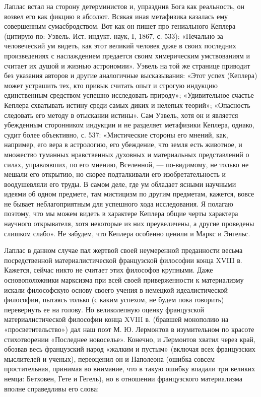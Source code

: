 Лаплас  встал   на  сторону   детерминистов  и,  упразднив   Бога  как
реальность, он возвел его как фикцию в абсолют. Всякая иная метафизика
казалась  ему  совершенным  сумасбродством.   Вот  как  он  пишет  про
гениального Кеплера (цитирую  по: Уэвель. Ист. индукт.  наук, I, 1867,
с. 533): «Печально за человеческий ум видеть, как этот великий человек
даже в  своих последних  произведениях с наслаждением  предается своим
химерическим  умствованиям и  считает их  душой и  жизнью астрономии».
Уэвель  на той  же странице  приводит  без указания  авторов и  другие
аналогичные высказывания:  «Этот успех (Кеплера) может  устрашить тех,
кто  привык считать  опыт  и строгую  индукцию единственным  средством
успешно исследовать природу»; «Удивительное счастье Кеплера схватывать
истину среди самых  диких и нелепых теорий»;  «Опасность следовать его
методу в отыскании истины». Сам  Уэвель, хотя он и является убежденным
сторонником индукции и не  разделяет метафизики Кеплера, однако, судит
более  объективно,  с.  537:  «Мистические стороны  его  мнений,  как,
например,  его  вера  в  астрологию, его  убеждение,  что  земля  есть
животное, и  множество туманных  нравственных духовных  и материальных
представлений  о силах,  управлявших,  по его  мнению, Вселенной,  ---
по-видимому, не только не мешали  его открытию, но скорее подталкивали
его изобретательность и  воодушевляли его труды. В самом  деле, где ум
обладает  ясными  научными идеями  об  одном  предмете, там  мистицизм
по  другим предметам,  кажется,  вовсе не  бывает неблагоприятным  для
успешного хода исследования. Я полагаю  поэтому, что мы можем видеть в
характере  Кеплера общие  черты характера  научного открывателя,  хотя
некоторые из них  преувеличены, а другие проведены  слишком слабо». Не
забудем, что Кеплера особенно ценили и Маркс и Энгельс.

Лаплас  в  данном случае  пал  жертвой  своей неумеренной  преданности
весьма посредственной  материалистической французской  философии конца
XVIII в.  Кажется, сейчас  никто не  считает этих  философов крупными.
Даже  основоположники  марксизма  при   всей  своей  приверженности  к
материализму  искали  философскую  основу  своего  учения  в  немецкой
идеалистической философии,  пытаясь только (с каким  успехом, не будем
пока  говорить)  перевернуть  ее  на голову.  Но  великолепную  оценку
французской  материалистической  философии  конца  XVIII  в.  (бравшей
монополию  на  «просветительство») дал  наш  поэт  М. Ю.  Лермонтов  в
изумительном по красоте  стихотворении «Последнее новоселье». Конечно,
и Лермонтов хватил через край,  обозвав весь французский народ «жалким
и пустым»  (включая всех французских мыслителей  и ученых), переоценил
он и Наполеона (ошибка совсем простительная, принимая во внимание, что
в такую ошибку впадали три великих немца: Бетховен, Гете и Гегель), но
в отношении французского материализма вполне справедливы его слова:

